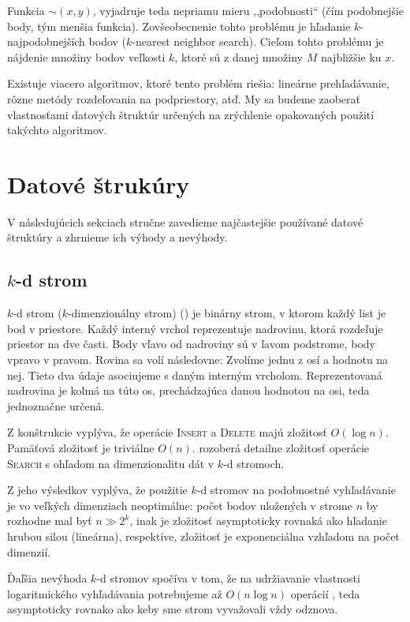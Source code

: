 \documentclass[10pt,a4paper,oneside]{article}
\begin{document}
{Funkcia $\sim(x, y)$, vyjadruje teda nepriamu mieru ,,podobnosti`` (čím podobnejšie body, tým menšia funkcia). Zovšeobecnenie tohto problému je hľadanie $k$-najpodobnejších bodov ($k$-nearest neighbor search). Cieľom tohto problému je nájdenie množiny bodov veľkosti $k$, ktoré sú z danej množiny $M$ najbližšie ku $x$.

Existuje viacero algoritmov, ktoré tento problém riešia: lineárne prehľadávanie, rôzne metódy rozdeľovania na podpriestory, atď. My sa budeme zaoberať vlastnosťami datových štruktúr určených na zrýchlenie opakovaných použití takýchto algoritmov.

\section{Datové štrukúry}

V následujúcich sekciach stručne zavedieme najčastejšie používané datové štruktúry a zhrnieme ich výhody a nevýhody.

\subsection{$k$-d strom}\label{kdtree}

$k$-d strom ($k$-dimenzionálny strom) (\citet{Bentley75}) je binárny strom, v ktorom každý list je bod v priestore. 
Každý interný vrchol reprezentuje nadrovinu, ktorá rozdeľuje priestor na dve časti. Body vľavo od nadroviny sú v ľavom podstrome, body vpravo v pravom. Rovina sa volí následovne:
Zvolíme jednu z osí a hodnotu na nej. Tieto dva údaje asociujeme s daným interným vrcholom. Reprezentovaná nadrovina je kolmá na túto os, prechádzajúca danou hodnotou na osi, teda jednoznačne určená.

Z konštrukcie vyplýva, že operácie \textsc{Insert} a \textsc{Delete} majú zložitosť $O(\log n)$. Pamäťová zložitosť je triviálne $O(n)$. \citet{liberty13} rozoberá detailne zložitosť operácie \textsc{Search} s ohľadom na dimenzionalitu dát v $k$-d stromoch.

Z jeho výsledkov vyplýva, že použitie $k$-d stromov na podobnostné vyhľadávanie je vo veľkých dimenziach neoptimálne: počet bodov uložených v strome $n$ by rozhodne mal byť $n \gg 2^k$, inak je zložitosť asymptoticky rovnaká ako hľadanie hrubou silou \citep{indyk04} (lineárna), respektíve, zložitosť je exponenciálna vzhľadom na počet dimenzií.

Ďaľšia nevýhoda $k$-d stromov spočíva v tom, že na udržiavanie vlastnosti logaritmického vyhľadávania potrebujeme až $O(n\log n)$ operácií \citep{Bentley75}, teda asymptoticky rovnako ako keby sme strom vyvažovali vždy odznova.

}
\end{document}
